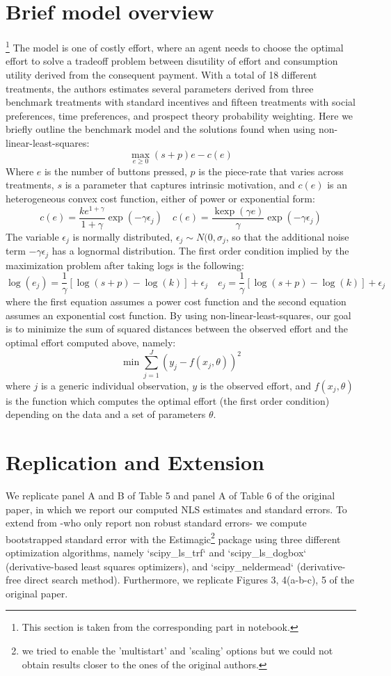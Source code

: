 \documentclass[11pt, a4paper, leqno]{article}
\begin{document}
\section{Brief model overview }\footnote{This section is taken from the corresponding part in \cite{PozziNunnari} notebook.}
\label{sec:model}
The model is one of costly effort, where an agent needs to choose the optimal effort to solve a tradeoff problem between disutility of effort and consumption utility derived from the consequent payment. With a total of 18 different treatments, the authors estimates several parameters derived from three benchmark treatments with standard incentives and fifteen treatments with social preferences, time preferences, and prospect theory probability weighting. Here we briefly outline the benchmark model and the solutions found when using non-linear-least-squares:
$$
\max _{e \geq 0}(s+p) e-c(e)
$$
Where $e$ is the number of buttons pressed, $p$ is the piece-rate that varies across treatments, $s$ is a parameter that captures intrinsic motivation, and $c(e)$ is an heterogeneous convex cost function, either of power or exponential form:
$$
c(e)=\frac{k e^{1+\gamma}}{1+\gamma} \exp \left(-\gamma \epsilon_{j}\right) \quad c(e)=\frac{\operatorname{kexp}(\gamma e)}{\gamma} \exp \left(-\gamma \epsilon_{j}\right)
$$
The variable $\epsilon_{j}$ is normally distributed, $\epsilon_{j}\sim N(0,\sigma_{j}$, so that the additional noise term $-\gamma \epsilon_{j}$ has a lognormal distribution. The first order condition implied by the maximization problem after taking logs is the following:
$$
\log \left(e_{j}\right)=\frac{1}{\gamma}[\log (s+p)-\log (k)]+\epsilon_{j} \quad e_{j}=\frac{1}{\gamma}[\log (s+p)-\log (k)]+\epsilon_{j}
$$
where the first equation assumes a power cost function and the second equation assumes an exponential cost function. By using non-linear-least-squares, our goal is to minimize the sum of squared distances between the observed effort and the optimal effort computed above, namely:
$$
\min \sum_{j=1}^{J}\left(y_{j}-f\left(x_{j}, \theta\right)\right)^{2}
$$
where $j$ is a generic individual observation, $y$ is the observed effort, and $f(x_{j}, \theta)$ is the function which computes the optimal effort (the first order condition) depending on the data and a set of parameters $\theta$.

\section{Replication and Extension}
\label{sec:repl}
We replicate panel A and B of Table 5 and panel A of Table 6 of the original paper, in which we report our computed NLS estimates and standard errors. To extend from \citet{PozziNunnari} -who only report non robust standard errors- we compute bootstrapped standard error with the Estimagic\footnote{we tried to enable the 'multistart' and 'scaling' options but we could not obtain results closer to the ones of the original authors.} package using three different optimization algorithms, namely `scipy\_ls\_trf` and `scipy\_ls\_dogbox` (derivative-based least squares optimizers), and `scipy\_neldermead` (derivative-free direct search method). Furthermore, we replicate Figures 3, 4(a-b-c), 5 of the original paper.
\end{document}
